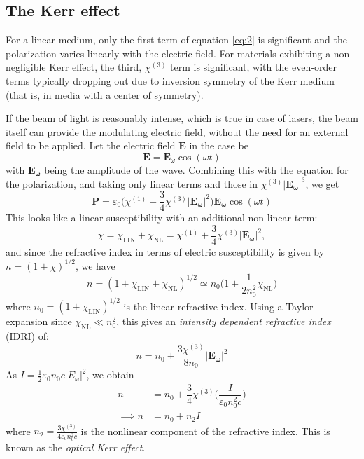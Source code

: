 \documentclass[%
 reprint,
 amsmath,amssymb,
 aps,
]{revtex4-2}
\begin{document}
	\subsection{The Kerr effect}
		For a linear medium, only the first term of equation \eqref{eq:2} is significant and the polarization varies linearly with the electric field. For materials exhibiting a non-negligible Kerr effect, the third, $ \chi^{(3)} $ term is significant, with the even-order terms typically dropping out due to inversion symmetry of the Kerr medium (that is, in media with a center of symmetry).
		\par 
		If the beam of light is reasonably intense, which is true in case of lasers, the beam itself can provide the modulating electric field, without the need for an external field to be applied. Let the electric field $ \mathbf{E} $ in the case be
		\begin{equation}\label{key}
			\mathbf{E} = \mathbf{E}_{\omega} \cos (\omega t)
		\end{equation}
		with $ \mathbf{E_{\omega}} $ being the amplitude of the wave. Combining this with the equation for the polarization, and taking only linear terms and those in $ \chi^{(3)} |\mathbf{E_{\omega}}|^3$, we get
		\begin{equation}\label{key}
			\mathbf{P} = \varepsilon_0 \Big( \chi^{(1)} + \dfrac{3}{4}\chi^{(3)} |\mathbf{E_{\omega}}|^2 \Big) \mathbf{E_{\omega}} \cos (\omega t)
		\end{equation}
		This looks like a linear susceptibility with an additional non-linear term:
		\begin{equation}\label{key}
			\chi = \chi_{\mathrm{LIN}} + \chi_{\mathrm{NL}} = \chi^{(1)} + \dfrac{3}{4}\chi^{(3)} |\mathbf{E_{\omega}}|^2,
		\end{equation}
		and since the refractive index in terms of electric susceptibility is given by $ n = (1 + \chi)^{1/2}$, we have
		\begin{equation}\label{key}
			n = (1 + \chi_{\mathrm{LIN}} + \chi_{\mathrm{NL}})^{1/2} \simeq n_0 \Big( 1 + \dfrac{1}{2n_0^2} \chi_{\mathrm{NL}} \Big)
		\end{equation}
		where $ n_0 = (1 + \chi_{\mathrm{LIN}})^{1/2} $ is the linear refractive index. Using a Taylor expansion since $ \chi_{\mathrm{NL}} \ll n_0^2 $, this gives an \textit{intensity dependent refractive index} (IDRI) of:
		\begin{equation}\label{eq:7}
				n = n_0 + \dfrac{3 \chi^{(3)}}{8 n_0} |\mathbf{E_{\omega}}|^2
		\end{equation}
		As $ I = \frac{1}{2} \varepsilon_0 n_0 c |E_{\omega}|^2$, we obtain
		\begin{equation}\label{eq:8}
			\begin{split}
				n &= n_0 + \dfrac{3}{4} \chi^{(3)} \Big( \dfrac{I}{\varepsilon_0 n_0^2 c} \Big) \\
				\implies n &= n_0 + n_2 I
			\end{split}
		\end{equation}
		where $ n_2  = \frac{3 \chi^{(3)}}{4 \varepsilon_0 n_0^2 c}$  is the nonlinear component of the refractive index. This is known as the \textit{optical Kerr effect}.
\end{document}
